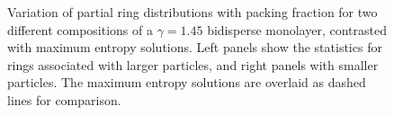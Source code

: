 \begin{figure}[bt]
     \caption{Variation of partial ring distributions with packing fraction for two different compositions of a $\gamma=1.45$ bidisperse monolayer, contrasted with maximum entropy solutions. Left panels show the statistics for rings associated with larger particles, and right panels with smaller particles. The maximum entropy solutions are overlaid as dashed lines for comparison.}
     \label{fig:bime}
\end{figure}



